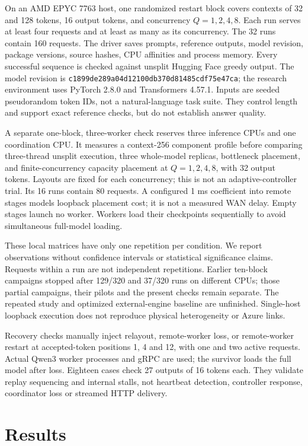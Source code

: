 \documentclass[conference]{IEEEtran}
\begin{document}
On an AMD EPYC 7763 host, one randomized restart block covers contexts
of 32 and 128 tokens, 16 output tokens, and concurrency \(Q=1,2,4,8\).
Each run serves at least four requests and at least as many as its
concurrency. The 32 runs contain 160 requests. The driver saves prompts,
reference outputs, model revision, package versions, source hashes, CPU
affinities and process memory. Every successful sequence is checked
against unsplit Hugging Face greedy output. The model revision is
\texttt{c1899de289a04d12100db370d81485cdf75e47ca}; the research
environment uses PyTorch 2.8.0 and Transformers 4.57.1. Inputs are
seeded pseudorandom token IDs, not a natural-language task suite. They
control length and support exact reference checks, but do not establish
answer quality.

A separate one-block, three-worker check reserves three inference CPUs
and one coordination CPU. It measures a context-256 component profile
before comparing three-thread unsplit execution, three whole-model
replicas, bottleneck placement, and finite-concurrency capacity
placement at \(Q=1,2,4,8\), with 32 output tokens. Layouts are fixed for
each concurrency; this is not an adaptive-controller trial. Its 16 runs
contain 80 requests. A configured 1 ms coefficient into remote stages
models loopback placement cost; it is not a measured WAN delay. Empty
stages launch no worker. Workers load their checkpoints sequentially to
avoid simultaneous full-model loading.

These local matrices have only one repetition per condition. We report
observations without confidence intervals or statistical significance
claims. Requests within a run are not independent repetitions. Earlier
ten-block campaigns stopped after 129/320 and 37/320 runs on different
CPUs; those partial campaigns, their pilots and the present checks
remain separate. The repeated study and optimized external-engine
baseline are unfinished. Single-host loopback execution does not
reproduce physical heterogeneity or Azure links.

Recovery checks manually inject relayout, remote-worker loss, or
remote-worker restart at accepted-token positions 1, 4 and 12, with one
and two active requests. Actual Qwen3 worker processes and gRPC are
used; the survivor loads the full model after loss. Eighteen cases check
27 outputs of 16 tokens each. They validate replay sequencing and
internal stalls, not heartbeat detection, controller response,
coordinator loss or streamed HTTP delivery.

\hypertarget{results}{%
\section{Results}\label{results}}
\end{document}
